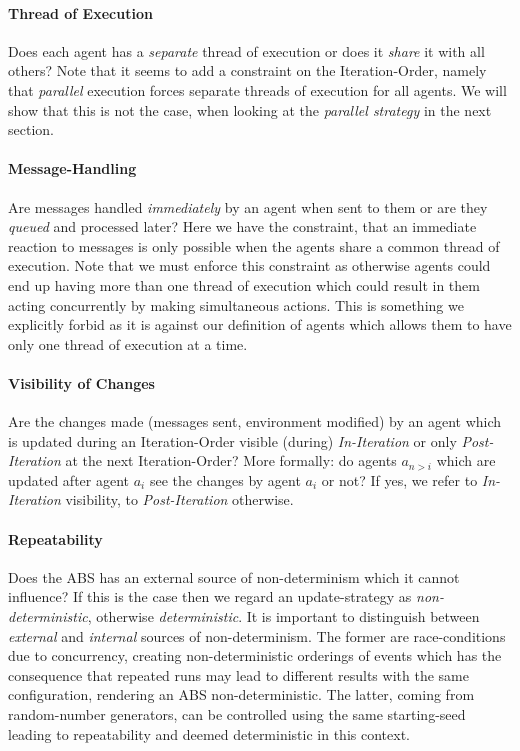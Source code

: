 \paragraph{Thread of Execution}
Does each agent has a \textit{separate} thread of execution or does it \textit{share} it with all others? Note that it seems to add a constraint on the Iteration-Order, namely that \textit{parallel} execution forces separate threads of execution for all agents. We will show that this is not the case, when looking at the \textit{parallel strategy} in the next section.

\paragraph{Message-Handling}
Are messages handled \textit{immediately} by an agent when sent to them or are they \textit{queued} and processed later? Here we have the constraint, that an immediate reaction to messages is only possible when the agents share a common thread of execution. Note that we must enforce this constraint as otherwise agents could end up having more than one thread of execution which could result in them acting concurrently by making simultaneous actions. This is something we explicitly forbid as it is against our definition of agents which allows them to have only one thread of execution at a time.

\paragraph{Visibility of Changes}
Are the changes made (messages sent, environment modified) by an agent which is updated during an Iteration-Order visible (during) \textit{In-Iteration} or only \textit{Post-Iteration} at the next Iteration-Order? More formally: do agents $a_{n>i}$ which are updated after agent $a_i$ see the changes by agent $a_i$ or not? If yes, we refer to \textit{In-Iteration} visibility, to \textit{Post-Iteration} otherwise.

\paragraph{Repeatability}
Does the ABS has an external source of non-determinism which it cannot influence? If this is the case then we regard an update-strategy as \textit{non-deterministic}, otherwise \textit{deterministic}. It is important to distinguish between \textit{external} and \textit{internal} sources of non-determinism. The former are race-conditions due to concurrency, creating non-deterministic orderings of events which has the consequence that repeated runs may lead to different results with the same configuration, rendering an ABS non-deterministic. The latter, coming from random-number generators, can be controlled using the same starting-seed leading to repeatability and deemed deterministic in this context. 


